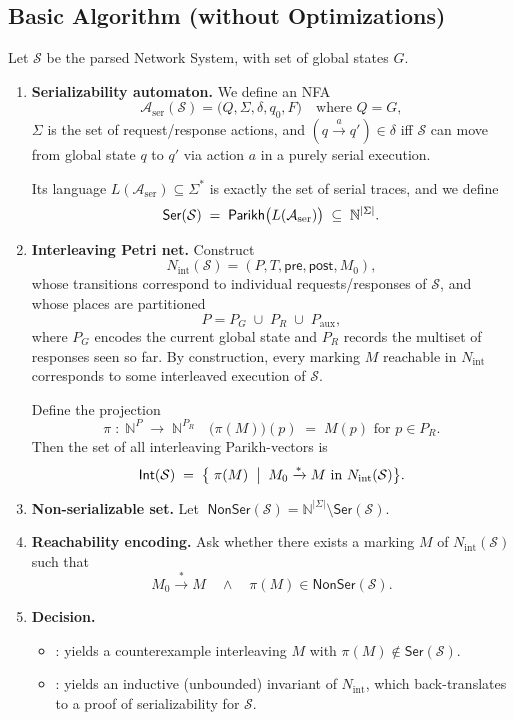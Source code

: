 \subsection{Basic Algorithm (without Optimizations)}

Let \(\mathcal S\) be the parsed Network System, with set of global states \(G\).  

\begin{enumerate}
	\item \textbf{Serializability automaton.}  
	We define an NFA
	\[
	\mathcal A_{\mathrm{ser}}(\mathcal S)
	= \bigl(Q,\Sigma,\delta,q_0,F\bigr)
	\quad\text{where }Q = G,
	\]
	\(\Sigma\) is the set of request/response actions, and
	\((q \xrightarrow{a} q')\in\delta\) iff \(\mathcal S\) can move from global
	state \(q\) to \(q'\) via action \(a\) in a purely serial execution.
	
	Its language \(L(\mathcal A_{\mathrm{ser}})\subseteq\Sigma^*\) is exactly
	the set of serial traces, and we define
	\[
	\mathsf{Ser}(\mathcal S)
	\;=\;
	\mathsf{Parikh}\bigl(L(\mathcal A_{\mathrm{ser}})\bigr)
	\;\subseteq\;\mathbb N^{|\Sigma|}.
	\]
	
	\item \textbf{Interleaving Petri net.}  
	Construct
	\[
	N_{\mathrm{int}}(\mathcal S)
	= (P, T, \mathsf{pre}, \mathsf{post}, M_0),
	\]
	whose transitions correspond to individual requests/responses of \(\mathcal S\),
	and whose places are partitioned
	\[
	P = P_G \;\cup\; P_R \;\cup\; P_{\mathrm{aux}},
	\]
	where \(P_G\) encodes the current global state and \(P_R\) records the multiset
	of responses seen so far.  By construction, every marking \(M\) reachable in
	\(N_{\mathrm{int}}\) corresponds to some interleaved execution of \(\mathcal S\).
	
	Define the projection
	\[
	\pi \;:\;\mathbb N^P \;\longrightarrow\;\mathbb N^{P_R}
	\quad\bigl(\pi(M)\bigr)(p)\;=\;M(p)\text{ for }p\in P_R.
	\]
	Then the set of all interleaving Parikh-vectors is
	\[
	\mathsf{Int}(\mathcal S)
	\;=\;
	\bigl\{\;\pi(M)\;\bigm|\;M_0 \xrightarrow{*} M\text{ in }N_{\mathrm{int}}(\mathcal S)\bigr\}.
	\]
	
	\item \textbf{Non-serializable set.}  
	Let
	\(\;\mathsf{NonSer}(\mathcal S)=\mathbb N^{|\Sigma|}\setminus \mathsf{Ser}(\mathcal S)\).
	
	\item \textbf{Reachability encoding.}  
	Ask whether there exists a marking \(M\) of \(N_{\mathrm{int}}(\mathcal S)\) such that
	\[
	M_0 \xrightarrow{*} M
	\quad\wedge\quad
	\pi(M)\in \mathsf{NonSer}(\mathcal S).
	\]
	
	\item \textbf{Decision.}  
	\begin{itemize}
		\item \sat: yields a counterexample interleaving \(M\) with
		\(\pi(M)\notin \mathsf{Ser}(\mathcal S)\).
		\item \unsat: yields an inductive (unbounded) invariant of
		\(N_{\mathrm{int}}\), which back-translates to a proof of
		serializability for \(\mathcal S\).
	\end{itemize}
\end{enumerate}

\newpage
